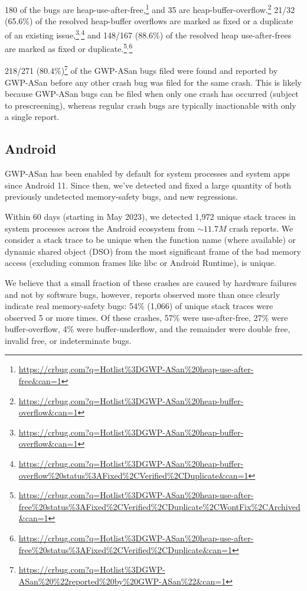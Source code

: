 180 of the bugs are
heap-use-after-free,\footnote{\url{https://crbug.com?q=Hotlist\%3DGWP-ASan\%20heap-use-after-free\&can=1}}
and 35 are
heap-buffer-overflow.\footnote{\url{https://crbug.com?q=Hotlist\%3DGWP-ASan\%20heap-buffer-overflow\&can=1}}
21/32 (65.6\%) of the resolved heap-buffer overflows are marked as fixed or a
duplicate of an existing
issue,\footnote{\url{https://crbug.com?q=Hotlist\%3DGWP-ASan\%20heap-buffer-overflow\&can=1}}$^,$\footnote{\url{https://crbug.com?q=Hotlist\%3DGWP-ASan\%20heap-buffer-overflow\%20status\%3AFixed\%2CVerified\%2CDuplicate\&can=1}}
and 148/167 (88.6\%) of the resolved heap use-after-frees are marked as fixed
or
duplicate.\footnote{\url{https://crbug.com?q=Hotlist\%3DGWP-ASan\%20heap-use-after-free\%20status\%3AFixed\%2CVerified\%2CDuplicate\%2CWontFix\%2CArchived\&can=1}}$^,$\footnote{\url{https://crbug.com?q=Hotlist\%3DGWP-ASan\%20heap-use-after-free\%20status\%3AFixed\%2CVerified\%2CDuplicate\&can=1}}

218/271
(80.4\%)\footnote{\url{https://crbug.com?q=Hotlist\%3DGWP-ASan\%20\%22reported\%20by\%20GWP-ASan\%22\&can=1}}
of the GWP-ASan bugs filed were found and reported by GWP-ASan before any other
crash bug was filed for the same crash. This is likely because GWP-ASan bugs
can be filed when only one crash has occurred (subject to prescreening),
whereas regular crash bugs are typically inactionable with only a single
report.

\subsection{Android}

GWP-ASan has been enabled by default for system processes and system apps since
Android 11. Since then, we've detected and fixed a large quantity of both
previously undetected memory-safety bugs, and new regressions.

Within 60 days (starting in May 2023), we detected 1,972 unique stack traces in
system processes across the Android ecosystem from ${\sim}11.7M$ crash reports.
We consider a stack trace to be unique when the function name (where available)
or dynamic shared object (DSO) from the most significant frame of the bad
memory access (excluding common frames like libc or Android Runtime), is
unique.

We believe that a small fraction of these crashes are caused by hardware
failures and not by software bugs, however, reports observed more than once
clearly indicate real memory-safety bugs: 54\% (1,066) of unique stack traces
were observed 5 or more times.
%
Of these crashes, 57\% were use-after-free, 27\% were buffer-overflow, 4\% were
buffer-underflow, and the remainder were double free, invalid free, or
indeterminate bugs.

